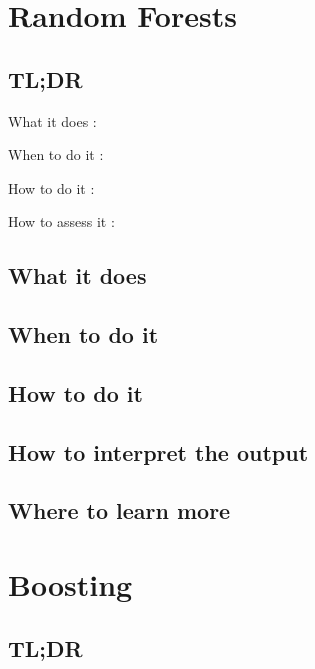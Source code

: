 \documentclass[
]{book}
\begin{document}
\hypertarget{random-forests}{%
\chapter{Random Forests}\label{random-forests}}

\hypertarget{tldr-17}{%
\section{TL;DR}\label{tldr-17}}

What it does
:

When to do it
:

How to do it
:

How to assess it
:

\hypertarget{what-it-does-17}{%
\section{What it does}\label{what-it-does-17}}

\hypertarget{when-to-do-it-17}{%
\section{When to do it}\label{when-to-do-it-17}}

\hypertarget{how-to-do-it-17}{%
\section{How to do it}\label{how-to-do-it-17}}

\hypertarget{how-to-interpret-the-output-17}{%
\section{How to interpret the output}\label{how-to-interpret-the-output-17}}

\hypertarget{where-to-learn-more-17}{%
\section{Where to learn more}\label{where-to-learn-more-17}}

\hypertarget{boosting}{%
\chapter{Boosting}\label{boosting}}

\hypertarget{tldr-18}{%
\section{TL;DR}\label{tldr-18}}
\end{document}
